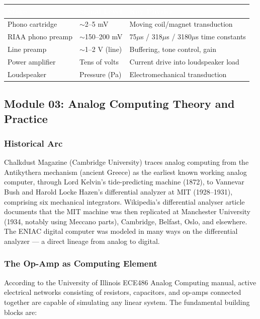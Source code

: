 \documentclass[11pt,letterpaper]{article}
\newcommand{\tableheader}[1]{\textbf{\sffamily\textcolor{white}{#1}}}
\begin{document}
\begin{center}
\begin{tabularx}{\textwidth}{L{3.5cm}L{3cm}X}
\toprule
{}
\tableheader{Stage} & \tableheader{Signal Level} & \tableheader{Key Physics} \\
\midrule
Phono cartridge & $\sim$2--5 mV & Moving coil/magnet transduction \\
RIAA phono preamp & $\sim$150--200 mV & 75$\mu$s / 318$\mu$s / 3180$\mu$s time constants \\
Line preamp & $\sim$1--2 V (line) & Buffering, tone control, gain \\
Power amplifier & Tens of volts & Current drive into loudspeaker load \\
Loudspeaker & Pressure (Pa) & Electromechanical transduction \\
\bottomrule
\end{tabularx}
\end{center}

\subsection{Module 03: Analog Computing Theory and Practice}

\subsubsection{Historical Arc}

Chalkdust Magazine (Cambridge University) traces analog computing from the Antikythera mechanism (ancient Greece) as the earliest known working analog computer, through Lord Kelvin's tide-predicting machine (1872), to Vannevar Bush and Harold Locke Hazen's differential analyzer at MIT (1928--1931), comprising six mechanical integrators. Wikipedia's differential analyser article documents that the MIT machine was then replicated at Manchester University (1934, notably using Meccano parts), Cambridge, Belfast, Oslo, and elsewhere. The ENIAC digital computer was modeled in many ways on the differential analyzer --- a direct lineage from analog to digital.

\subsubsection{The Op-Amp as Computing Element}

According to the University of Illinois ECE486 Analog Computing manual, active electrical networks consisting of resistors, capacitors, and op-amps connected together are capable of simulating any linear system. The fundamental building blocks are:
\end{document}
